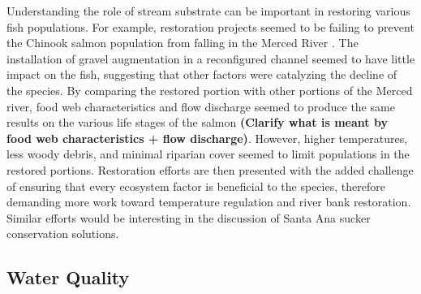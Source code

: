\documentclass{article}\usepackage[]{graphicx}\usepackage[]{color}
\begin{document}
Understanding the role of stream substrate can be important in restoring various fish populations. For example, restoration projects seemed to be failing to prevent the Chinook salmon population from falling in the Merced River \citep{albertson13}. The installation of gravel augmentation in a reconfigured channel seemed to have little impact on the fish, suggesting that other factors were catalyzing the decline of the species. By comparing the restored portion with other portions of the Merced river, food web characteristics and flow discharge seemed to produce the same results on the various life stages of the salmon \textbf{(Clarify what is meant by food web characteristics + flow discharge)}. However, higher temperatures, less woody debris, and minimal riparian cover seemed to limit populations in the restored portions. Restoration efforts are then presented with the added challenge of ensuring that every ecosystem factor is beneficial to the species, therefore demanding more work toward temperature regulation and river bank restoration. Similar efforts would be interesting in the discussion of Santa Ana sucker conservation solutions.

\subsection{Water Quality}
\end{document}
